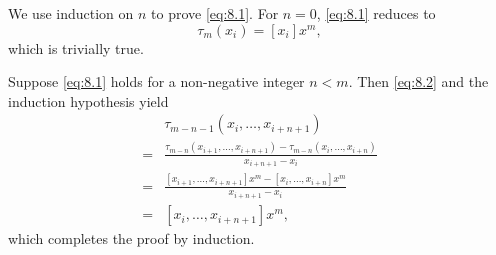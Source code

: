 \documentclass[a4paper]{article}
\begin{document}
We use induction on $n$ to prove \eqref{eq:8.1}. For $n=0$, \eqref{eq:8.1} reduces to 
$$
\tau_{m}(x_i)=[x_i]x^m,
$$
which is trivially true.

Suppose \eqref{eq:8.1} holds for a non-negative integer $n<m$. Then \eqref{eq:8.2} and the induction hypothesis yield 
$$
\begin{aligned}
  &\tau_{m-n-1}(x_{i},\ldots,x_{i+n+1})\\
  =&\frac{\tau_{m-n}(x_{i+1},\ldots,x_{i+n+1})-\tau_{m-n}(x_{i},\ldots,x_{i+n})}{x_{i+n+1}-x_{i}}\\
  =&\frac{[x_{i+1},\ldots,x_{i+n+1}]x^{m}-[x_{i},\ldots,x_{i+n}]x^{m}}{x_{i+n+1}-x_{i}}\\
  =&[x_{i},\ldots,x_{i+n+1}]x^{m},
\end{aligned}
$$
which completes the proof by induction.
\end{document}
